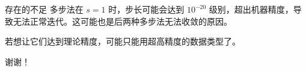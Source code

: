 \documentclass{beamer}
\begin{document}
\begin{frame}{存在的不足}
	多步法在 $s=1$ 时，步长可能会达到 $10^{-20}$ 级别，超出机器精度，导致无法正常迭代。这可能也是后两种多步法无法收敛的原因。

	若想让它们达到理论精度，可能只能用超高精度的数据类型了。
\end{frame}

\begin{frame}
\Huge{\centerline{谢谢！}}
\end{frame}
\end{document}
